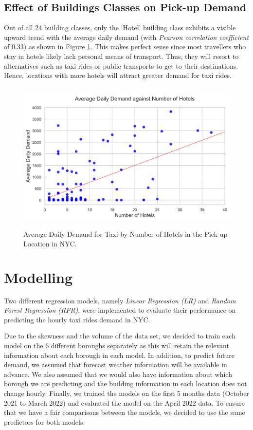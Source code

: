 \documentclass[11pt]{article}
\begin{document}
\subsection{Effect of Buildings Classes on Pick-up Demand}
Out of all 24 building classes, only the `Hotel' building class exhibits a visible upward trend with the average daily demand (with \textit{Pearson correlation coefficient} of 0.33) as shown in Figure \ref{fig:hotel_trend}. This makes perfect sense since most travellers who stay in hotels likely lack personal means of transport. Thus, they will resort to alternatives such as taxi rides or public transports to get to their destinations. Hence, locations with more hotels will attract greater demand for taxi rides.
\vspace{-2mm}
\begin{figure}[h]
    \centering
    \includegraphics[width=5in, height=3in]{plots/hotel_on_pickup.png}

    \caption{Average Daily Demand for Taxi by Number of Hotels in the Pick-up Location in NYC.}
    \label{fig:hotel_trend}
\end{figure}


\section{Modelling}
Two different regression models, namely \textit{Linear Regression (LR)} and \textit{Random Forest Regression (RFR)}, were implemented to evaluate their performance on predicting the hourly taxi rides demand in NYC.

Due to the skewness and the volume of the data set, we decided to train each model on the 6 different boroughs separately as this will retain the relevant information about each borough in each model. In addition, to predict future demand, we assumed that forecast weather information will be available in advance. We also assumed that we would also have information about which borough we are predicting and the building information in each location does not change hourly. Finally, we trained the models on the first 5 months data (October 2021 to March 2022) and evaluated the model on the April 2022 data. To ensure that we have a fair comparisons between the models, we decided to use the same predictors for both models. 
\end{document}
